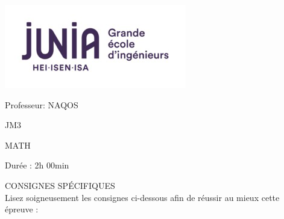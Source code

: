 \documentclass{book}%
\begin{document}
%
\normalsize%
\newpage%
\thispagestyle{empty}%
\vskip-40mm	\includegraphics[scale=0.5]{logo.png} \\%
 \begin{flushright}  \vskip-20mm   Professeur: NAQOS\vskip15mm  \end{flushright}%
JM3%
\begin{center}   \begin{Large}MATH\end{Large} \end{center}%
Durée : 2h 00min%
 \begin{center} { \large CONSIGNES SPÉCIFIQUES } \\ Lisez soigneusement les consignes ci-dessous afin de réussir au mieux cette épreuve : \end{center} %
\end{document}

